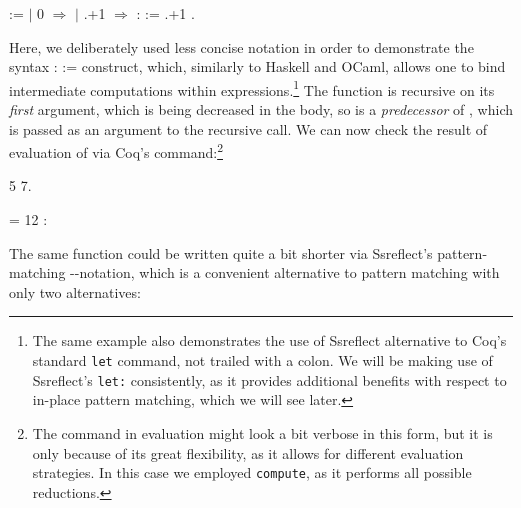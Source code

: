 \begin{coqdoccode}
\coqdocemptyline
\coqdocnoindent
{}    := \coqdoceol
\coqdocindent{0.50em}
   \coqdoceol
\coqdocindent{0.50em}
\ensuremath{|} 0     \ensuremath{\Rightarrow}    \coqdoceol
\coqdocindent{0.50em}
\ensuremath{|} .+1 \ensuremath{\Rightarrow} :  :=     .+1\coqdoceol
\coqdocindent{0.50em}
.\coqdoceol
\coqdocemptyline
\end{coqdoccode}


Here, we deliberately used less concise notation in order to
demonstrate the syntax :  :=    construct, which,
similarly to Haskell and OCaml, allows one to bind intermediate
computations within expressions.\footnote{The same example also
demonstrates the use of Ssreflect alternative to Coq's standard
\texttt{let} command, not trailed with a colon. We will be making use
of Ssreflect's \texttt{let:} consistently, as it provides additional
benefits with respect to in-place pattern matching, which we will see
later.} The function  is recursive on its \textit{first}
argument, which is being decreased in the body, so  is a
\textit{predecessor} of , which is passed as an argument to the recursive
call. We can now check the result of evaluation of  via Coq's
    command:\footnote{The command in
evaluation might look a bit verbose in this form, but it is only
because of its great flexibility, as it allows for different
evaluation strategies. In this case we employed \texttt{compute}, as
it performs all possible reductions.}


\begin{coqdoccode}
\coqdocemptyline
\coqdocnoindent
{}    5 7.\coqdoceol
\end{coqdoccode}


  = 12 :  


The same function could be written quite a bit shorter via Ssreflect's
pattern-matching --notation, which is a convenient alternative
to pattern matching with only two alternatives:



